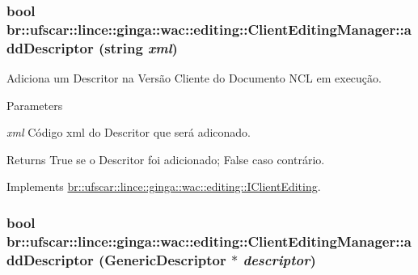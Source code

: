 \hypertarget{classbr_1_1ufscar_1_1lince_1_1ginga_1_1wac_1_1editing_1_1ClientEditingManager_ab6fd5b9535b8d6e377aab7b7af4c2902}{
\subsubsection[{addDescriptor}]{\setlength{\rightskip}{0pt plus 5cm}bool br::ufscar::lince::ginga::wac::editing::ClientEditingManager::addDescriptor (string {\em xml})}}
\label{classbr_1_1ufscar_1_1lince_1_1ginga_1_1wac_1_1editing_1_1ClientEditingManager_ab6fd5b9535b8d6e377aab7b7af4c2902}


Adiciona um Descritor na Versão Cliente do Documento NCL em execução. 


\begin{DoxyParams}{Parameters}
\item[{\em xml}]Código xml do Descritor que será adiconado. \end{DoxyParams}
\begin{DoxyReturn}{Returns}
True se o Descritor foi adicionado; False caso contrário. 
\end{DoxyReturn}


Implements \hyperlink{classbr_1_1ufscar_1_1lince_1_1ginga_1_1wac_1_1editing_1_1IClientEditing_af7aa3b95abda814fbf7cadbd277dc2c1}{br::ufscar::lince::ginga::wac::editing::IClientEditing}.

\hypertarget{classbr_1_1ufscar_1_1lince_1_1ginga_1_1wac_1_1editing_1_1ClientEditingManager_ad43d65396682df3c57e131e5531e7e4d}{
\subsubsection[{addDescriptor}]{\setlength{\rightskip}{0pt plus 5cm}bool br::ufscar::lince::ginga::wac::editing::ClientEditingManager::addDescriptor (GenericDescriptor $\ast$ {\em descriptor})}}
\label{classbr_1_1ufscar_1_1lince_1_1ginga_1_1wac_1_1editing_1_1ClientEditingManager_ad43d65396682df3c57e131e5531e7e4d}


